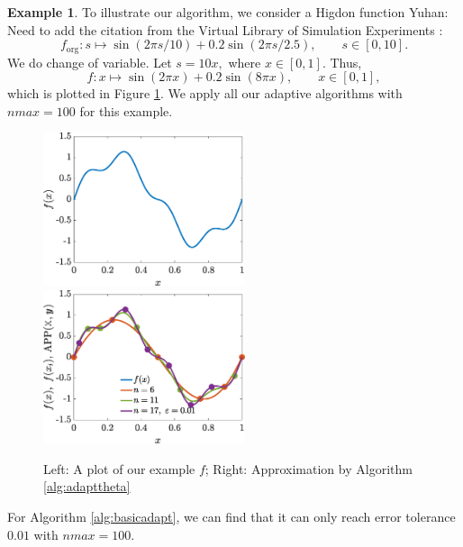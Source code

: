 \documentclass[]{mcom-l}
\theoremstyle{plain}
\theoremstyle{definition}
\newtheorem{example}{Example}
\newcommand{\YuhanNote}[1]{{\color{magenta}Yuhan: #1}}
\begin{document}
\begin{example}
	\label{ex:higdon}
	To illustrate our algorithm, we consider a Higdon function \YuhanNote{Need to add the citation} from the Virtual Library of Simulation Experiments \cite{VirLib17a}:
	\begin{equation*}
	f_{\text{org}}: s \mapsto  \sin(2\pi s/10) + 0.2 \sin(2\pi s/2.5), \qquad s \in [0,10].
	\end{equation*}
	We do change of variable. Let $s= 10 x,$ where $x \in [0,1].$ Thus,
		\begin{equation}
	f: x \mapsto  \sin(2\pi x) + 0.2 \sin(8\pi x), \qquad x \in [0,1],
	\end{equation}
	which is plotted in Figure \ref{fig:ex4a}.  We apply all our adaptive algorithms with $nmax = 100$ for this example. 
		\begin{figure}[H]
		\centering
		\includegraphics[height = 4.5cm]{ProgramsImages/HigdonFunPlot.eps}
		\includegraphics[height = 4.5cm]{ProgramsImages/AdaptAlgo3_HigdonFun_GaussKernel_adapt_th_EmpBayesAx_theta_1.eps}\caption{Left: A plot of our example $f$; Right: Approximation by Algorithm \ref{alg:adapttheta} \label{fig:ex4a}}
	\end{figure}
	
	For Algorithm \ref{alg:basicadapt}, we can find that it can only reach error tolerance $0.01$ with $nmax = 100.$
		
	\\
	

\end{example}
\end{document}
